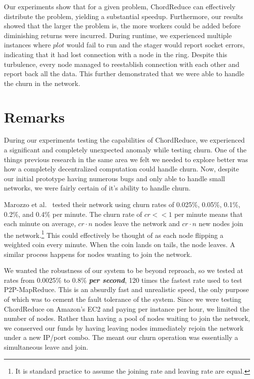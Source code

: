 Our experiments show that for a given problem, ChordReduce can effectively distribute the problem, yielding a substantial speedup.  Furthermore, our results showed that the larger the problem is, the more workers could be added before diminishing returns were incurred.  During runtime, we experienced multiple instances where $plot$ would fail to run and the stager would report socket errors, indicating that it had lost connection with a node in the ring.  Despite this turbulence, every node managed to reestablish connection with each other and report back all the data.  This further demonstrated that we were able to handle the churn in the network.


\section{Remarks}


During our experiments testing the capabilities of ChordReduce, we experienced a significant and completely unexpected anomaly while testing churn.
One of the things previous research \cite{marozzo2012p2p}  \cite{leemap} in the same area we felt we needed to explore better was how a completely decentralized computation could handle churn.
Now, despite our initial prototype having numerous bugs and only able to handle small networks, we were fairly certain of it's ability to handle churn.

Marozzo et al.\ \cite{marozzo2012p2p} tested their network using churn rates of 0.025\%, 0.05\%, 0.1\%, 0.2\%, and 0.4\% per minute.
The churn rate of $cr << 1$ per minute means that each minute on average, $cr \cdot n$ nodes leave the network and $cr \cdot n$  new nodes join the network.\footnote{It is standard practice to assume the joining rate and leaving rate are equal.}
This could effectively be thought of as each node flipping a weighted coin every minute.
When the coin lands on tails, the node leaves.
A similar process happens for nodes wanting to join the network.

We wanted the robustness of our system to be beyond reproach, so we tested at rates from 0.0025\% to 0.8\% \textbf{\textit{per second}}, 120 times the fastest rate used to test P2P-MapReduce.
This is an absurdly fast and unrealistic speed, the only purpose of which was to cement the fault tolerance of the system.
Since we were testing ChordReduce on Amazon's EC2 and paying per instance per hour, we limited the number of nodes.
Rather than having a pool of nodes waiting to join the network, we conserved our funds by having leaving nodes immediately rejoin the network under a new IP/port combo.
The meant our churn operation was essentially a simultaneous leave and join.


